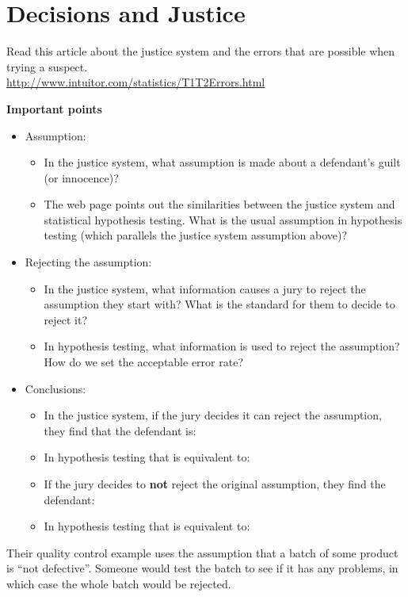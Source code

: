 \def\theTopic{Reading 14}

\section{Decisions and Justice}

 Read this article about the justice system and the errors that are
 possible when trying a suspect.\\
\url{http://www.intuitor.com/statistics/T1T2Errors.html}  

\begin{center}
  {\bf Important points}
\end{center}

\begin{itemize}
  \item Assumption:
        \begin{itemize}
        \item In the justice system, what assumption is made about a
          defendant's guilt (or innocence)?\vfill
        \item The web page points out the similarities between the
          justice system and statistical hypothesis testing. What is
          the usual assumption in hypothesis testing (which parallels
          the justice system assumption above)?\vfill
        \end{itemize}
  \item Rejecting the assumption:
    \begin{itemize}
      \item In the justice system, what information causes a jury to
      reject the assumption they start with?  What is the standard for
      them to decide to reject it?\vfill
      \item In hypothesis testing, what information is used to reject
        the assumption?  How do we set the acceptable error rate? \vfill
      \end{itemize}
    \item Conclusions:
      \begin{itemize}
      \item In the justice system, if the jury decides it can reject
        the assumption, they find that the defendant is: \vspace{.8cm}
      \item In hypothesis testing that is equivalent to:\vspace{1cm}
      \item If the jury decides to {\bf not} reject the original
        assumption, they find the defendant: \vspace{.8cm}
      \item In hypothesis testing that is equivalent to:\vspace{1cm}
      \end{itemize}
  \end{itemize}
\newpage
    Their quality control example uses the assumption that a batch of
    some product is ``not defective''. Someone would test the batch to
    see if it has any problems, in which case the whole batch would be
    rejected. 

